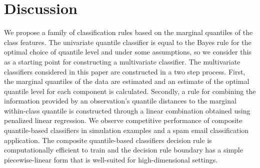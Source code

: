 
\section{Discussion}
\label{sec:discussion}

We propose a family of classification rules based on the marginal quantiles of
the class features.  The univariate quantile classifier is equal to the Bayes
rule for the optimal choice of quantile level and under some assumptions, so we
consider this as a starting point for constructing a multivariate classifier.
The multivariate classifiers considered in this paper are constructed in a two
step process.  First, the marginal quantiles of the data are estimated and an
estimate of the optimal quantile level for each component is calculated.
Secondly, a rule for combining the information provided by an observation's
quantile distances to the marginal within-class quantile is constructed through
a linear combination obtained using penalized linear regression.  We observe
competitive performance of composite quantile-based classifiers in simulation
examples and a spam email classification application.  The composite
quantile-based classifiers decision rule is computationally efficient to train
and the decision rule boundary has a simple piecewise-linear form that is
well-suited for high-dimensional settings.









